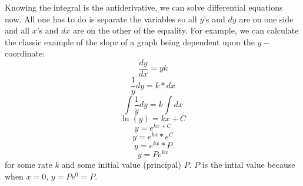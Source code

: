\documentclass[../revisedmain.tex]{subfiles}
\begin{document}
Knowing the integral is the antiderivative, we can solve differential equations now. All one has to do is separate the variables so all $y$'s and $dy$ are on one side and all $x$'s and $dx$ are on the other of the equality. For example, we can calculate the classic example of the slope of a graph being dependent upon the $y-$coordinate:$$\frac{dy}{dx}=yk$$$$\frac{1}{y}dy=k*dx$$$$\int\frac{1}{y}dy=k\int dx$$$$\ln(y)=kx+C$$$$y=e^{kx+C}$$$$y=e^{kx}*e^C$$$$y=e^{kx}*P$$$$y=Pe^{kx}$$ for some rate \textit{k} and some initial value (principal) $P$. $P$ is the intial value because when $x=0$, $y=Pe^{0}=P$.\\
\end{document}
